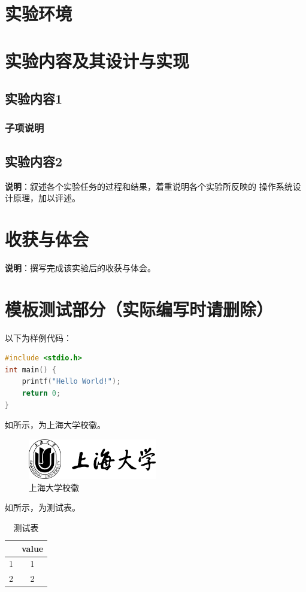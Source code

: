 \documentclass[lang=cn,a4paper,chinesefont=founder]{shu-lab-report}
\begin{document}
\section{实验环境}

\section{实验内容及其设计与实现}

\subsection{实验内容1}

\subsubsection{子项说明}

\subsection{实验内容2}

\textbf{说明}：叙述各个实验任务的过程和结果，着重说明各个实验所反映的
操作系统设计原理，加以评述。

\section{收获与体会}

\textbf{说明}：撰写完成该实验后的收获与体会。

\section{模板测试部分（实际编写时请删除）}

以下为样例代码：

\begin{lstlisting}[language=C]
#include <stdio.h>
int main() {
    printf("Hello World!");
    return 0;
}
\end{lstlisting}


如所示，为上海大学校徽。

\begin{figure}[!htbp]
    \centering
    \includegraphics[width=0.5\textwidth]{image/shulogo.png}
    \caption{上海大学校徽}
    \label{fig:example}
\end{figure}

如所示，为测试表。

\begin{table}[!htbp]
    \caption{测试表}
    \label{tab:example}
    \centering
    \begin{tabular}{cc}
        \toprule
            & value\\
        \midrule
        1   & 1     \\
        2   & 2     \\
        \bottomrule
    \end{tabular}
\end{table}
\end{document}
